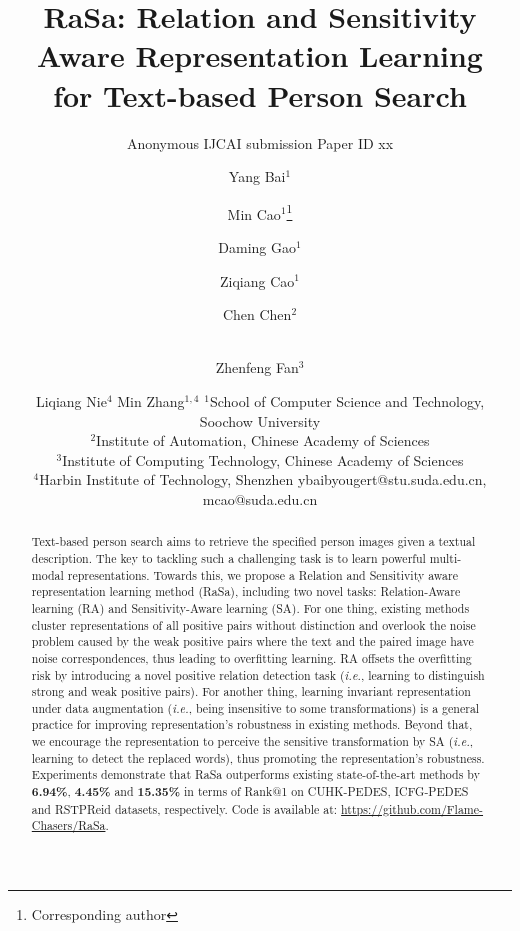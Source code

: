 \documentclass{article}
\title{RaSa: Relation and Sensitivity Aware Representation Learning \\for Text-based Person Search}
\author{
    Anonymous IJCAI submission 
    \affiliations
    Paper ID xx
}
\author{
Yang Bai$^1$\and
Min Cao$^1$\thanks{Corresponding author}\and
Daming Gao$^1$\and
Ziqiang Cao$^1$\and
Chen Chen$^{2}$\and\\
Zhenfeng Fan$^{3}$\and
Liqiang Nie$^4$\And
Min Zhang$^{1,4}$
\affiliations
$^1$School of Computer Science and Technology, Soochow University\\
$^2$Institute of Automation, Chinese Academy of Sciences\\
$^3$Institute of Computing Technology, Chinese Academy of Sciences\\
$^4$Harbin Institute of Technology, Shenzhen
\emails
ybaibyougert@stu.suda.edu.cn,
mcao@suda.edu.cn
}
\begin{document}
\maketitle

\begin{abstract}
Text-based person search aims to retrieve the specified person images given a textual description. 
The key to tackling such a challenging task is to learn powerful multi-modal representations. 
Towards this, we propose a Relation and Sensitivity aware representation learning method (RaSa), including two novel tasks: Relation-Aware learning (RA) and Sensitivity-Aware learning (SA).
For one thing, existing methods cluster representations of all positive pairs without distinction and overlook the noise problem caused by the weak positive pairs where the text and the paired image have noise correspondences, thus leading to overfitting learning.
RA offsets the overfitting risk by introducing a novel positive relation detection task (\emph{i.e.}, learning to distinguish strong and weak positive pairs).
For another thing, learning invariant representation under data augmentation (\emph{i.e.}, being insensitive to some transformations) is a general practice for improving representation's robustness in existing methods. 
Beyond that, we encourage the representation to perceive the sensitive transformation by SA (\emph{i.e.}, learning to detect the replaced words), thus promoting the representation's robustness.
Experiments demonstrate that RaSa outperforms existing state-of-the-art methods by \textbf{6.94\%}, \textbf{4.45\%} and \textbf{15.35\%} in terms of Rank@1 on CUHK-PEDES, ICFG-PEDES and RSTPReid datasets, respectively.
Code is available at: \href{https://github.com/Flame-Chasers/RaSa}{https://github.com/Flame-Chasers/RaSa}.
\end{abstract}
\end{document}

